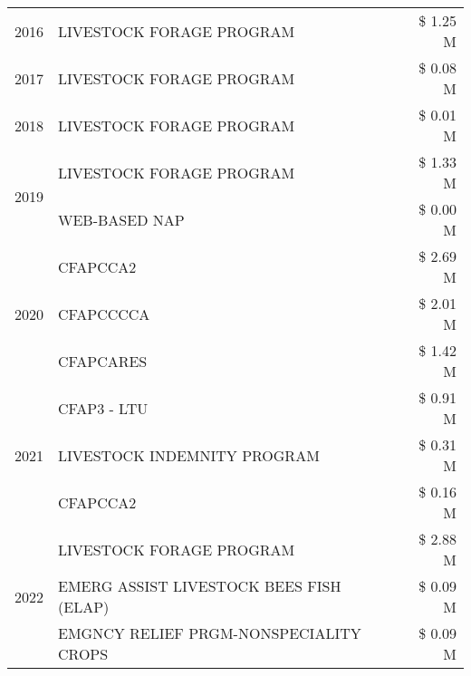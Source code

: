 \begin{tabular}{llr}
\cline{1-3}
2016 & LIVESTOCK FORAGE PROGRAM & \$ 1.25 M \\
\cline{1-3}
2017 & LIVESTOCK FORAGE PROGRAM & \$ 0.08 M \\
\cline{1-3}
2018 & LIVESTOCK FORAGE PROGRAM & \$ 0.01 M \\
\cline{1-3}
\multirow[t]{2}{*}{2019} & LIVESTOCK FORAGE PROGRAM & \$ 1.33 M \\
 & WEB-BASED NAP & \$ 0.00 M \\
\cline{1-3}
\multirow[t]{3}{*}{2020} & CFAPCCA2 & \$ 2.69 M \\
 & CFAPCCCCA & \$ 2.01 M \\
 & CFAPCARES & \$ 1.42 M \\
\cline{1-3}
\multirow[t]{3}{*}{2021} & CFAP3 - LTU & \$ 0.91 M \\
 & LIVESTOCK INDEMNITY PROGRAM & \$ 0.31 M \\
 & CFAPCCA2 & \$ 0.16 M \\
\cline{1-3}
\multirow[t]{3}{*}{2022} & LIVESTOCK FORAGE PROGRAM & \$ 2.88 M \\
 & EMERG ASSIST LIVESTOCK BEES FISH (ELAP) & \$ 0.09 M \\
 & EMGNCY RELIEF PRGM-NONSPECIALITY CROPS & \$ 0.09 M \\
\cline{1-3}
\bottomrule
\end{tabular}
